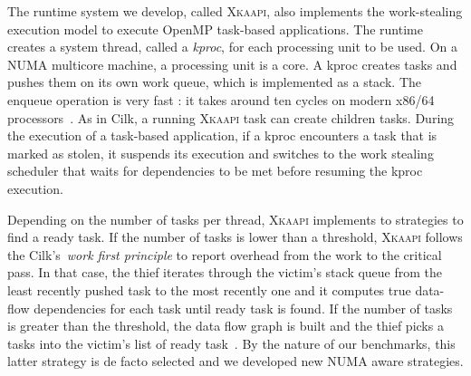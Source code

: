 \documentclass{Styles/llncs}
\newcommand{\kaapi}{\textsc{\mbox{Xkaapi}}\xspace}
\begin{document}
The runtime system we develop, called \kaapi, also implements the work-stealing execution model to execute OpenMP task-based applications.
The runtime creates a system thread, called a \emph{kproc}, for each processing unit to be used.
On a NUMA multicore machine, a processing unit is a core.
A kproc creates tasks and pushes them on its own work queue, which is implemented as a stack.
The enqueue operation is very fast : it takes around ten cycles on modern x86/64 processors~\cite{libkomp}.
As in Cilk, a  running \kaapi task can create children tasks. 
During the execution of a task-based application, if a kproc encounters a task that is marked as stolen, it suspends its execution and switches to
the work stealing scheduler that waits for dependencies to be met before
resuming the kproc execution. 

Depending on the number of tasks per thread, \kaapi implements to strategies to find a ready task. 
If the number of tasks is lower than a threshold, \kaapi follows the Cilk's~\textit{work first principle} to report overhead
from the work to the critical pass. In that case, the thief iterates through the victim's stack queue from 
the least recently pushed task to the most recently one and it computes true
data-flow dependencies for each task until ready task is found. If the number of tasks is greater than the threshold, 
the data flow graph is built and the thief picks a tasks into the victim's list of ready task~\cite{Bleuse2014}.
By the nature of our benchmarks, this latter strategy is de facto selected and we developed new NUMA aware strategies.

%
\end{document}
